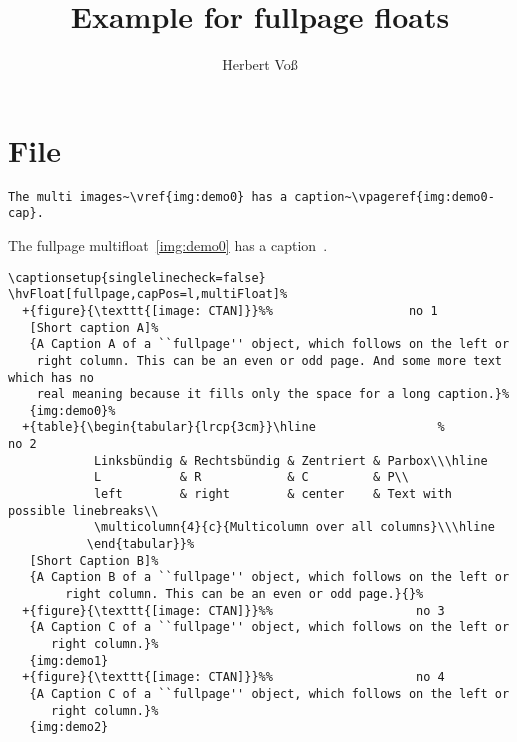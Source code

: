 \documentclass[twoside]{scrartcl}
\begin{document}
\title{Example for fullpage floats}
\author{Herbert Voß}
\maketitle

\tableofcontents

\blinddocument

\section{File \texttt{\jobname}}

\begin{lstlisting}
The multi images~\vref{img:demo0} has a caption~\vpageref{img:demo0-cap}.
\end{lstlisting}

The fullpage multifloat~\vref{img:demo0} has a caption~.


\begin{lstlisting}
\captionsetup{singlelinecheck=false}
\hvFloat[fullpage,capPos=l,multiFloat]%
  +{figure}{\texttt{[image: CTAN]}}%%                   no 1
   [Short caption A]%
   {A Caption A of a ``fullpage'' object, which follows on the left or
    right column. This can be an even or odd page. And some more text which has no
    real meaning because it fills only the space for a long caption.}%
   {img:demo0}%
  +{table}{\begin{tabular}{lrcp{3cm}}\hline                 %             no 2
            Linksbündig & Rechtsbündig & Zentriert & Parbox\\\hline
            L           & R            & C         & P\\
            left        & right        & center    & Text with possible linebreaks\\
            \multicolumn{4}{c}{Multicolumn over all columns}\\\hline
           \end{tabular}}%
   [Short Caption B]%
   {A Caption B of a ``fullpage'' object, which follows on the left or
        right column. This can be an even or odd page.}{}%
  +{figure}{\texttt{[image: CTAN]}}%%                    no 3
   {A Caption C of a ``fullpage'' object, which follows on the left or
      right column.}%
   {img:demo1}
  +{figure}{\texttt{[image: CTAN]}}%%                    no 4
   {A Caption C of a ``fullpage'' object, which follows on the left or
      right column.}%
   {img:demo2}
\end{lstlisting}
\end{document}
